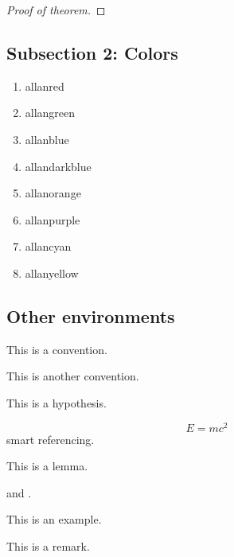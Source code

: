 \documentclass[UTF8, 12pt]{extarticle}
\begin{document}
\begin{proof}[Proof of theorem]
    \end{proof}

    \subsection{Subsection 2: Colors}
    \begin{enumerate}
        \item {\color{allanred}allanred}
        \item {\color{allangreen}allangreen}
        \item {\color{allanblue}allanblue}
        \item {\color{allandarkblue}allandarkblue}
        \item {\color{allanorange}allanorange}
        \item {\color{allanpurple}allanpurple}
        \item {\color{allancyan}allancyan}
        \item {\color{allanyellow}allanyellow}
    \end{enumerate}

    \subsection{Other environments}
    \begin{convention}[Convention]\label{convention}
        This is a convention.
    \end{convention}
    \begin{convention}\label{another convention}
        This is another convention.
    \end{convention}
    \begin{hypothesis}[Hypothesis]\label{hypothesis}
        This is a hypothesis.
    \end{hypothesis}
    \begin{equation}\label{eqn:big equation}
        E = mc^2
    \end{equation}
     smart referencing.
    \begin{lemma}\label{lemma}
        This is a lemma.
    \end{lemma}
     and .
    \begin{example}[Example]\label{example}
        This is an example.
    \end{example}
    \begin{remark}
        This is a remark.
    \end{remark}
\end{document}
